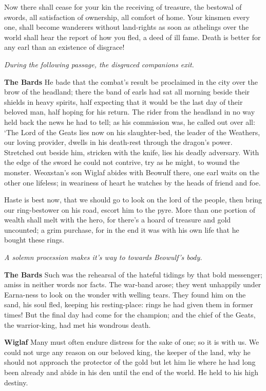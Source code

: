 \documentclass[a4paper]{article}
\begin{document}
{Now there shall cease for your kin the receiving of treasure,
the bestowal of swords, all satisfaction of ownership,
all comfort of home. Your kinsmen every one,
shall become wanderers without land-rights
as soon as athelings over the world
shall hear the report of how you fled,
a deed of ill fame. Death is better
for any earl than an existence of disgrace!

\centerline{\textit{During the following passage, the disgraced companions exit.}}

\textbf{The Bards} He bade that the combat’s result be proclaimed in the city
over the brow of the headland; there the band of earls
had sat all morning beside their shields
in heavy spirits, half expecting
that it would be the last day of their beloved man,
half hoping for his return. The rider from the headland
in no way held back the news he had to tell;
as his commission was, he called out over all:
‘The Lord of the Geats lies now on his slaughter-bed,
the leader of the Weathers, our loving provider,
dwells in his death-rest through the dragon’s power.
Stretched out beside him, stricken with the knife,
lies his deadly adversary. With the edge of the sword
he could not contrive, try as he might,
to wound the monster. Weoxstan’s son
Wiglaf abides with Beowulf there,
one earl waits on the other one lifeless;
in weariness of heart he watches by the heads
of friend and foe.

Haste is best now,
that we should go to look on the lord of the people,
then bring our ring-bestower on his road,
escort him to the pyre. More than one portion of wealth
shall melt with the hero, for there’s a hoard of treasure
and gold uncounted; a grim purchase,
for in the end it was with his own life
that he bought these rings.

\centerline{\textit{A solemn procession makes it's way to towards Beowulf's body.}}

\textbf{The Bards} Such was the rehearsal of the hateful tidings
by that bold messenger; amiss in neither
words nor facts. The war-band arose;
they went unhappily under Earna-ness
to look on the wonder with welling tears.
They found him on the sand, his soul fled,
keeping his resting-place: rings he had given them
in former times! But the final day
had come for the champion; and the chief of the Geats,
the warrior-king, had met his wondrous death.

\textbf{Wiglaf} Many must often endure distress
for the sake of one; so it is with us.
We could not urge any reason
on our beloved king, the keeper of the land,
why he should not approach the protector of the gold
but let him lie where he had long been already
and abide in his den until the end of the world.
He held to his high destiny.

}
\end{document}
